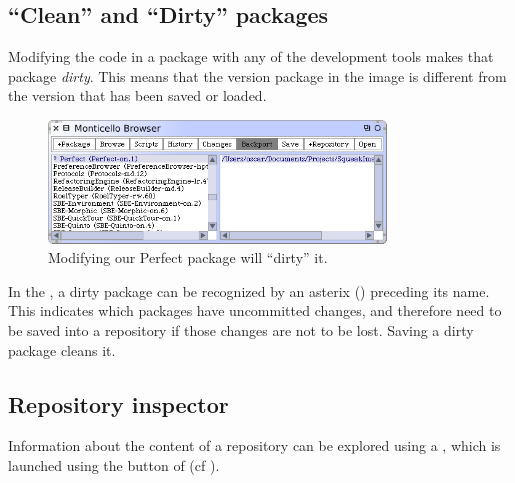 \documentclass[a4paper,10pt,twoside]{book}
\begin{document}
\subsection{``Clean'' and ``Dirty'' packages}

Modifying the code in a package with any of the development tools makes that package \emph{dirty}.
This means that the version package in the image is different from the version that has been saved or loaded. 

\begin{figure}[ht]\centering
	\includegraphics[width=0.8\textwidth]{dirty}
	\caption{Modifying our Perfect package will ``dirty'' it.}
\end{figure}

In the \MCB,  a dirty package can be recognized by an asterix (\ct{*}) preceding its name.  This indicates which packages have uncommitted changes, and therefore need to be saved into a repository if those changes are not to be lost. Saving a dirty package cleans it.



\subsection{Repository inspector} 

Information about the content of a repository can be explored using a \RI, which is launched using the  button of \MC (cf ).
\end{document}
